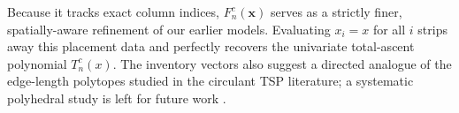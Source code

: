 \documentclass[11pt,a4paper]{amsart}
\newcommand{\1}{\mathbf{1}}
\begin{document}
Because it tracks exact column indices, $F_n^c(\bm{x})$ serves as a strictly finer, spatially-aware refinement of our earlier models. Evaluating $x_i = x$ for all $i$ strips away this placement data and perfectly recovers the univariate total-ascent polynomial $T_n^c(x)$.
The inventory vectors also suggest a directed analogue of the edge-length polytopes studied in the circulant TSP literature; a systematic polyhedral study is left for future work \cite{Gutekunst2025}.
%
%
\end{document}
